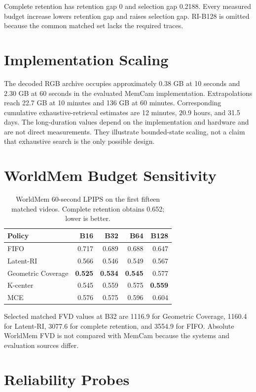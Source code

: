 \documentclass[10pt,twocolumn]{article}
\newcommand{\RI}{\textsc{RI}\xspace}
\begin{document}
Complete retention has retention gap 0 and selection gap 0.2188. Every measured
budget increase lowers retention gap and raises selection gap. \RI-B128 is
omitted because the common matched set lacks the required traces.

\section{Implementation Scaling}
\label{app:scaling}

The decoded RGB archive occupies approximately 0.38 GB at 10 seconds and 2.30
GB at 60 seconds in the evaluated MemCam implementation. Extrapolations reach
22.7 GB at 10 minutes and 136 GB at 60 minutes. Corresponding cumulative
exhaustive-retrieval estimates are 12 minutes, 20.9 hours, and 31.5 days. The
long-duration values depend on the implementation and hardware and are not
direct measurements. They illustrate bounded-state scaling, not a claim that
exhaustive search is the only possible design.

\clearpage
\section{WorldMem Budget Sensitivity}

\begin{table}[!htbp]
\centering
\caption{WorldMem 60-second LPIPS on the first fifteen matched videos. Complete
retention obtains 0.652; lower is better.}
\small
\begin{tabular}{lrrrr}
\toprule
Policy & B16 & B32 & B64 & B128 \\
\midrule
FIFO & 0.717 & 0.689 & 0.688 & 0.647 \\
Latent-\RI & 0.566 & 0.546 & 0.549 & 0.567 \\
Geometric Coverage & \textbf{0.525} & \textbf{0.534} & \textbf{0.545} & 0.577 \\
K-center & 0.545 & 0.559 & 0.575 & \textbf{0.559} \\
MCE & 0.576 & 0.575 & 0.596 & 0.604 \\
\bottomrule
\end{tabular}
\end{table}

Selected matched FVD values at B32 are 1116.9 for Geometric Coverage, 1160.4
for Latent-\RI, 3077.6 for complete retention, and 3554.9 for FIFO. Absolute
WorldMem FVD is not compared with MemCam because the systems and evaluation
sources differ.

\section{Reliability Probes}
\label{app:reliability}
\end{document}
